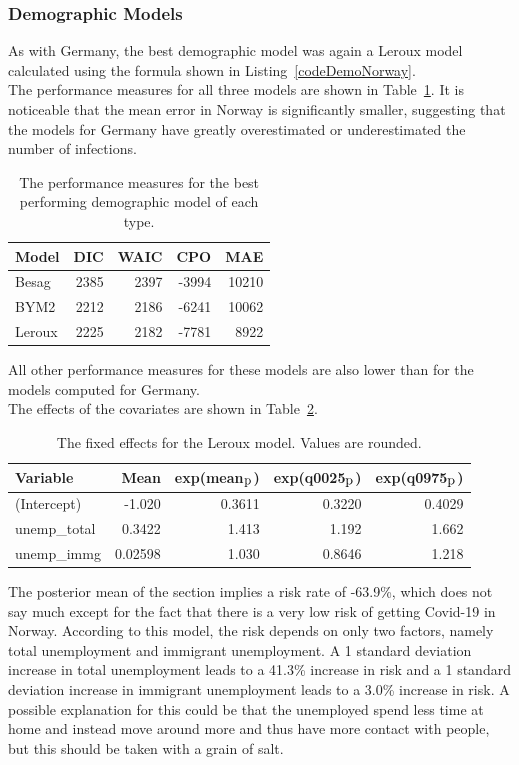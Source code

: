 \subsubsection{Demographic Models}
As with Germany, the best demographic model was again a Leroux model calculated using the formula shown in Listing~\ref{codeDemoNorway}. \\
The performance measures for all three models are shown in Table~\ref{demoNorway}. It is noticeable that the mean error in Norway is significantly smaller, suggesting that the models for Germany have greatly overestimated or underestimated the number of infections.
\begin{table}[H] 
\caption{The performance measures for the best performing demographic model of each type. \label{demoNorway}}
\begin{tabular}{l r r r r}
\toprule
\textbf{Model}	& \textbf{DIC}	& \textbf{WAIC} & \textbf{CPO} & \textbf{MAE}\\
\midrule
Besag  & 2385 & 2397 & -3994 & 10210 \\
BYM2 & 2212 & 2186 & -6241 & 10062\\
Leroux & 2225  & 2182 & -7781 & 8922\\
\bottomrule
\end{tabular}
\end{table}
All other performance measures for these models are also lower than for the models computed for Germany. \\
The effects of the covariates are shown in Table~\ref{fixedDemoNorway}.
\begin{table}[H] 
\caption{The fixed effects for the Leroux model. Values are rounded. \label{fixedDemoNorway}}
\begin{tabular}{l r r r r}
\toprule
\textbf{Variable}	& \textbf{Mean}	& \textbf{exp(mean$_{\hbox{p}}$)} & \textbf{exp(q0025$_{\hbox{p}}$)} & \textbf{exp(q0975$_{\hbox{p}}$)} \\
\midrule
(Intercept) & -1.020 & 0.3611 & 0.3220 & 0.4029 \\
unemp\_total & 0.3422 & 1.413 & 1.192 & 1.662 \\
unemp\_immg & 0.02598 & 1.030 & 0.8646 & 1.218 \\
\bottomrule
\end{tabular}
\end{table}
The posterior mean of the section implies a risk rate of -63.9\%, which does not say much except for the fact that there is a very low risk of getting Covid-19 in Norway. According to this model, the risk depends on only two factors, namely total unemployment and immigrant unemployment. A 1 standard deviation increase in total unemployment leads to a 41.3\% increase in risk and a 1 standard deviation increase in immigrant unemployment leads to a 3.0\% increase in risk. A possible explanation for this could be that the unemployed spend less time at home and instead move around more and thus have more contact with people, but this should be taken with a grain of salt.
